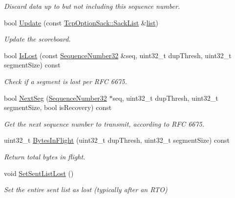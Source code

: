 \begin{DoxyCompactItemize}
\begin{DoxyCompactList}\small\item\em Discard data up to but not including this sequence number. \end{DoxyCompactList}\item 
bool \hyperlink{classns3_1_1TcpTxBuffer_abed2d31821b2d946068c517195f5cc61}{Update} (const \hyperlink{classns3_1_1TcpOptionSack_a2aa2d721c71424680d79ebaa079f264a}{Tcp\+Option\+Sack\+::\+Sack\+List} \&\hyperlink{openflow-interface_8h_afd9bcfa176617760671b67580f536fa7}{list})
\begin{DoxyCompactList}\small\item\em Update the scoreboard. \end{DoxyCompactList}\item 
bool \hyperlink{classns3_1_1TcpTxBuffer_add55043ebbafc30ba4e48d3f8aa9f064}{Is\+Lost} (const \hyperlink{group__network_gacb2070e4e98d2d5135c9bede58f07a03}{Sequence\+Number32} \&seq, uint32\+\_\+t dup\+Thresh, uint32\+\_\+t segment\+Size) const 
\begin{DoxyCompactList}\small\item\em Check if a segment is lost per R\+FC 6675. \end{DoxyCompactList}\item 
bool \hyperlink{classns3_1_1TcpTxBuffer_ad08eadd0ba92849a4c4a6920b72acb69}{Next\+Seg} (\hyperlink{group__network_gacb2070e4e98d2d5135c9bede58f07a03}{Sequence\+Number32} $\ast$seq, uint32\+\_\+t dup\+Thresh, uint32\+\_\+t segment\+Size, bool is\+Recovery) const 
\begin{DoxyCompactList}\small\item\em Get the next sequence number to transmit, according to R\+FC 6675. \end{DoxyCompactList}\item 
uint32\+\_\+t \hyperlink{classns3_1_1TcpTxBuffer_a4c14562ad63e699927b3def1c1c12efa}{Bytes\+In\+Flight} (uint32\+\_\+t dup\+Thresh, uint32\+\_\+t segment\+Size) const 
\begin{DoxyCompactList}\small\item\em Return total bytes in flight. \end{DoxyCompactList}\item 
void \hyperlink{classns3_1_1TcpTxBuffer_ae8f6a815193ad7280815a70b91aac72f}{Set\+Sent\+List\+Lost} ()
\begin{DoxyCompactList}\small\item\em Set the entire sent list as lost (typically after an R\+TO) \end{DoxyCompactList}\item 

\end{DoxyCompactItemize}
